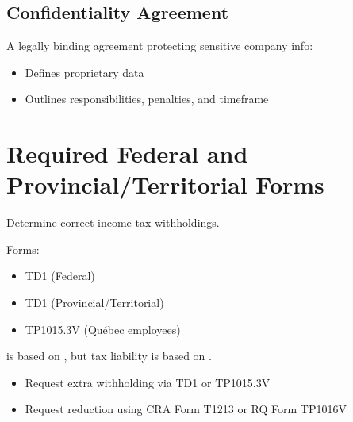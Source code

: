\documentclass[letterpaper,10pt,english]{sphinxmanual}
\begin{document}
\subsection{Confidentiality Agreement}
\label{\detokenize{onboarding_employee:confidentiality-agreement}}
\sphinxAtStartPar
A legally binding agreement protecting sensitive company info:
\begin{itemize}
\item {} 
\sphinxAtStartPar
Defines proprietary data

\item {} 
\sphinxAtStartPar
Outlines responsibilities, penalties, and timeframe

\end{itemize}


\section{Required Federal and Provincial/Territorial Forms}
\label{\detokenize{onboarding_employee:required-federal-and-provincial-territorial-forms}}
\sphinxAtStartPar
{} Determine correct income tax withholdings.

\sphinxAtStartPar
Forms:
\begin{itemize}
\item {} 
\sphinxAtStartPar
TD1 (Federal)

\item {} 
\sphinxAtStartPar
TD1 (Provincial/Territorial)

\item {} 
\sphinxAtStartPar
TP\sphinxhyphen{}1015.3\sphinxhyphen{}V (Québec employees)

\end{itemize}

\sphinxAtStartPar
{} is based on , but tax liability is based on .

\sphinxAtStartPar
{}
\begin{itemize}
\item {} 
\sphinxAtStartPar
Request extra withholding via TD1 or TP\sphinxhyphen{}1015.3\sphinxhyphen{}V

\item {} 
\sphinxAtStartPar
Request reduction using CRA Form T1213 or RQ Form TP\sphinxhyphen{}1016\sphinxhyphen{}V

\end{itemize}
\end{document}
